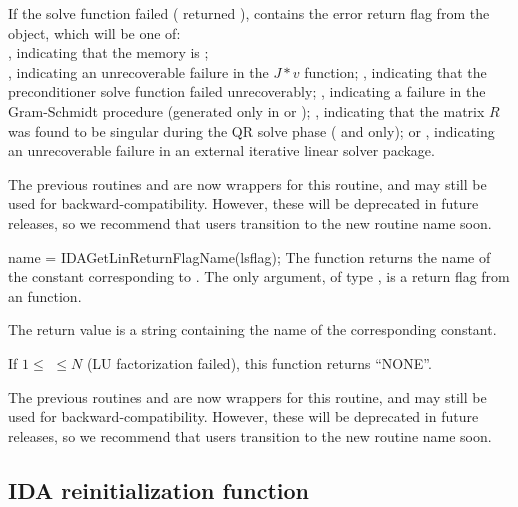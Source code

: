 {{  If the {\idals} solve function failed ( returned
  ),  contains the error return flag from
  the {\sunlinsol} object, which will be one of: \\ \noindent
  , indicating that the {\sunlinsol} memory is ;
  \\ \noindent {}, indicating an
  unrecoverable failure in the $J*v$ function;
  , indicating that the preconditioner solve
  function  failed unrecoverably;
  , indicating a failure in the Gram-Schmidt
  procedure (generated only in {\spgmr} or {\spfgmr});
  , indicating that the matrix $R$ was found to be
  singular during the QR solve phase ({\spgmr} and {\spfgmr} only); or
  , indicating an unrecoverable
  failure in an external iterative linear solver package.

  The previous routines  and
   are now wrappers for this routine, and may
  still be used for backward-compatibility.  However, these will be
  deprecated in future releases, so we recommend that users transition
  to the new routine name soon.
}
{
  name = IDAGetLinReturnFlagName(lsflag);
}
{
  The function  returns the
  name of the {\idals} constant corresponding to .
}
{
  The only argument, of type , is a return flag from an
  {\idals} function.
}
{
  The return value is a string containing the name of the corresponding
  constant.

  If $1 \leq $  $ \leq N$ (LU factorization failed), this
  function returns ``NONE''.
}
{
  The previous routines  and
   are now wrappers for this routine, and may
  still be used for backward-compatibility.  However, these will be
  deprecated in future releases, so we recommend that users transition
  to the new routine name soon.
}




\subsection{IDA reinitialization function}\label{sss:idareinit}

}
